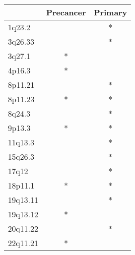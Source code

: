 \begin{tabular}{lcc}
\toprule
{} & Precancer & Primary \\
\midrule
1q23.2   &           &       * \\
3q26.33  &           &       * \\
3q27.1   &         * &         \\
4p16.3   &         * &         \\
8p11.21  &           &       * \\
8p11.23  &         * &       * \\
8q24.3   &           &       * \\
9p13.3   &         * &       * \\
11q13.3  &           &       * \\
15q26.3  &           &       * \\
17q12    &           &       * \\
18p11.1  &         * &       * \\
19q13.11 &           &       * \\
19q13.12 &         * &         \\
20q11.22 &           &       * \\
22q11.21 &         * &         \\
\bottomrule
\end{tabular}
